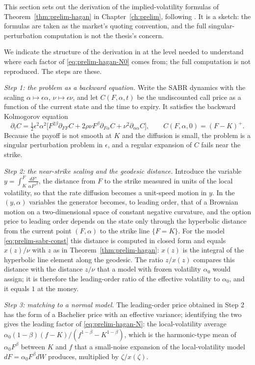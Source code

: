 \documentclass[../../main.tex]{subfiles}
\begin{document}
This section sets out the derivation of the implied-volatility formulas of Theorem~\ref{thm:prelim-hagan} in Chapter~\ref{ch:prelim}, following \cite{hagan2002}. It is a sketch: the formulas are taken as the market's quoting convention, and the full singular-perturbation computation is not the thesis's concern.

We indicate the structure of the derivation in \cite{hagan2002} at the level needed to understand where each factor of \eqref{eq:prelim-hagan-N0} comes from; the full computation is not reproduced. The steps are these.

\emph{Step 1: the problem as a backward equation.} Write the SABR dynamics with the scaling $\alpha\mapsto\epsilon\alpha$, $\nu\mapsto\epsilon\nu$, and let $C(F,\alpha,t)$ be the undiscounted call price as a function of the current state and the time to expiry. It satisfies the backward Kolmogorov equation
\[
\partial_tC=\tfrac12\epsilon^2\alpha^2\big[F^{2\beta}\partial_{FF}C+2\rho\nu F^{\beta}\partial_{F\alpha}C+\nu^2\partial_{\alpha\alpha}C\big],\qquad C(F,\alpha,0)=(F-K)^+ .
\]
Because the payoff is not smooth at $K$ and the diffusion is small, the problem is a singular perturbation problem in $\epsilon$, and a regular expansion of $C$ fails near the strike.

\emph{Step 2: the near-strike scaling and the geodesic distance.} Introduce the variable $y=\int_K^F\frac{dF'}{\alpha F'^{\beta}}$, the distance from $F$ to the strike measured in units of the local volatility, so that the rate diffusion becomes a unit-speed motion in $y$. In the $(y,\alpha)$ variables the generator becomes, to leading order, that of a Brownian motion on a two-dimensional space of constant negative curvature, and the option price to leading order depends on the state only through the hyperbolic distance from the current point $(F,\alpha)$ to the strike line $\{F=K\}$. For the model \eqref{eq:prelim-sabr-const} this distance is computed in closed form and equals $x(z)/\nu$ with $z$ as in Theorem~\ref{thm:prelim-hagan}: $x(z)$ is the integral of the hyperbolic line element along the geodesic. The ratio $z/x(z)$ compares this distance with the distance $z/\nu$ that a model with frozen volatility $\alpha_0$ would assign; it is therefore the leading-order ratio of the effective volatility to $\alpha_0$, and it equals $1$ at the money.

\emph{Step 3: matching to a normal model.} The leading-order price obtained in Step 2 has the form of a Bachelier price with an effective variance; identifying the two gives the leading factor of \eqref{eq:prelim-hagan-N}: the local-volatility average $\alpha_0(1-\beta)(f-K)/(f^{1-\beta}-K^{1-\beta})$, which is the harmonic-type mean of $\alpha_0F^{\beta}$ between $K$ and $f$ that a small-noise expansion of the local-volatility model $dF=\alpha_0F^{\beta}dW$ produces, multiplied by $\zeta/x(\zeta)$.
\end{document}
